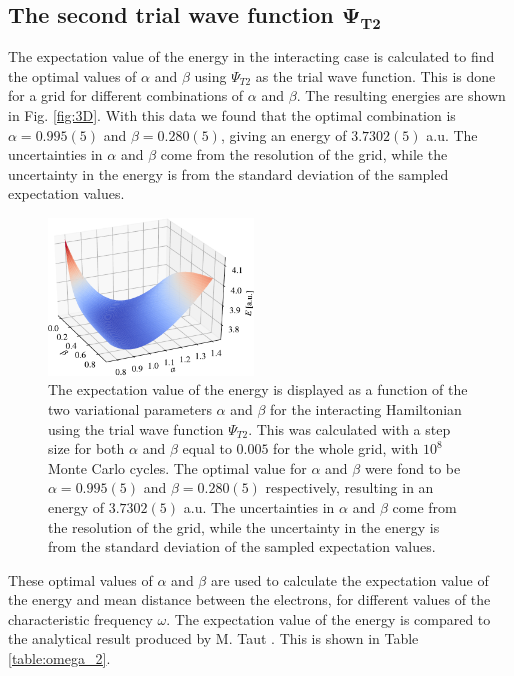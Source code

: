 \documentclass[%
 reprint,
nofootinbib,
aps,
]{revtex4-1}
\begin{document}
\subsection{The second trial wave function $\boldsymbol{\Psi_{T2}}$}

The expectation value of the energy in the interacting case is calculated to find the optimal values of $\alpha$ and $\beta$  using $\Psi_{T2}$ as the trial wave function. This is done for a grid for different combinations of $\alpha$ and $\beta$. The resulting energies are shown in Fig. \vref{fig:3D}. With this data we found that the optimal combination is $\alpha=0.995(5)$ and $\beta=0.280(5)$, giving an energy of $3.7302(5)$ a.u. The uncertainties in $\alpha$ and $\beta$ come from the resolution of the grid, while the uncertainty in the energy is from the standard deviation of the sampled expectation values. \par

\begin{figure}
  \centering
  \includegraphics[width=0.485\textwidth]{../figures/3D.pdf}
  \caption{The expectation value of the energy is displayed as a function of the two variational parameters $\alpha$ and $\beta$ for the interacting Hamiltonian using the trial wave function $\Psi_{T2}$. This was calculated with a step size for both $\alpha$ and $\beta$ equal to $0.005$ for the whole grid, with $10^8$ Monte Carlo cycles. The optimal value for $\alpha$ and $\beta$ were fond to be $\alpha=0.995(5)$ and $\beta=0.280(5)$ respectively, resulting in an energy of $3.7302(5)$ a.u. The uncertainties in $\alpha$ and $\beta$ come from the resolution of the grid, while the uncertainty in the energy is from the standard deviation of the sampled expectation values.}
  \label{fig:3D}
\end{figure}

These optimal values of $\alpha$ and $\beta$ are used to calculate the expectation value of the energy and mean distance between the electrons, for different values of the characteristic frequency $\omega$. The expectation value of the energy is compared to the analytical result produced by M. Taut \cite{taut}. This is shown in Table \vref{table:omega_2}.
\end{document}
